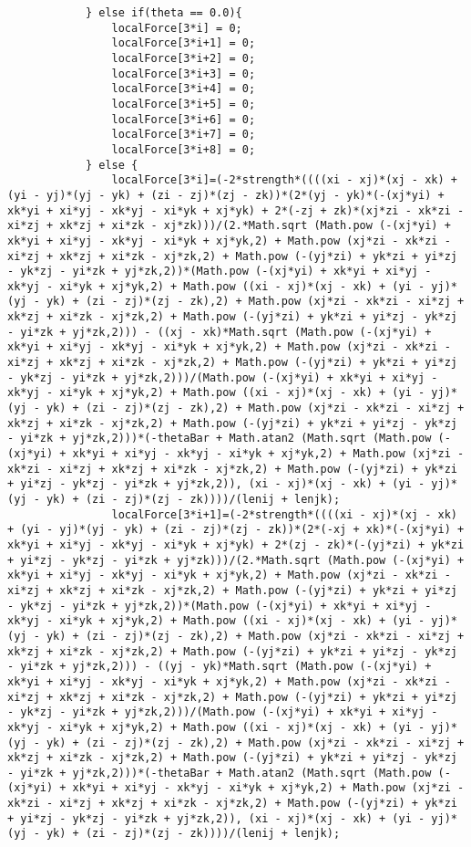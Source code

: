 \begin{lstlisting}
			} else if(theta == 0.0){
				localForce[3*i] = 0;
				localForce[3*i+1] = 0;
				localForce[3*i+2] = 0;
				localForce[3*i+3] = 0;
				localForce[3*i+4] = 0;
				localForce[3*i+5] = 0;
				localForce[3*i+6] = 0;
				localForce[3*i+7] = 0;
				localForce[3*i+8] = 0;
			} else {
				localForce[3*i]=(-2*strength*((((xi - xj)*(xj - xk) + (yi - yj)*(yj - yk) + (zi - zj)*(zj - zk))*(2*(yj - yk)*(-(xj*yi) + xk*yi + xi*yj - xk*yj - xi*yk + xj*yk) + 2*(-zj + zk)*(xj*zi - xk*zi - xi*zj + xk*zj + xi*zk - xj*zk)))/(2.*Math.sqrt (Math.pow (-(xj*yi) + xk*yi + xi*yj - xk*yj - xi*yk + xj*yk,2) + Math.pow (xj*zi - xk*zi - xi*zj + xk*zj + xi*zk - xj*zk,2) + Math.pow (-(yj*zi) + yk*zi + yi*zj - yk*zj - yi*zk + yj*zk,2))*(Math.pow (-(xj*yi) + xk*yi + xi*yj - xk*yj - xi*yk + xj*yk,2) + Math.pow ((xi - xj)*(xj - xk) + (yi - yj)*(yj - yk) + (zi - zj)*(zj - zk),2) + Math.pow (xj*zi - xk*zi - xi*zj + xk*zj + xi*zk - xj*zk,2) + Math.pow (-(yj*zi) + yk*zi + yi*zj - yk*zj - yi*zk + yj*zk,2))) - ((xj - xk)*Math.sqrt (Math.pow (-(xj*yi) + xk*yi + xi*yj - xk*yj - xi*yk + xj*yk,2) + Math.pow (xj*zi - xk*zi - xi*zj + xk*zj + xi*zk - xj*zk,2) + Math.pow (-(yj*zi) + yk*zi + yi*zj - yk*zj - yi*zk + yj*zk,2)))/(Math.pow (-(xj*yi) + xk*yi + xi*yj - xk*yj - xi*yk + xj*yk,2) + Math.pow ((xi - xj)*(xj - xk) + (yi - yj)*(yj - yk) + (zi - zj)*(zj - zk),2) + Math.pow (xj*zi - xk*zi - xi*zj + xk*zj + xi*zk - xj*zk,2) + Math.pow (-(yj*zi) + yk*zi + yi*zj - yk*zj - yi*zk + yj*zk,2)))*(-thetaBar + Math.atan2 (Math.sqrt (Math.pow (-(xj*yi) + xk*yi + xi*yj - xk*yj - xi*yk + xj*yk,2) + Math.pow (xj*zi - xk*zi - xi*zj + xk*zj + xi*zk - xj*zk,2) + Math.pow (-(yj*zi) + yk*zi + yi*zj - yk*zj - yi*zk + yj*zk,2)), (xi - xj)*(xj - xk) + (yi - yj)*(yj - yk) + (zi - zj)*(zj - zk))))/(lenij + lenjk);
				localForce[3*i+1]=(-2*strength*((((xi - xj)*(xj - xk) + (yi - yj)*(yj - yk) + (zi - zj)*(zj - zk))*(2*(-xj + xk)*(-(xj*yi) + xk*yi + xi*yj - xk*yj - xi*yk + xj*yk) + 2*(zj - zk)*(-(yj*zi) + yk*zi + yi*zj - yk*zj - yi*zk + yj*zk)))/(2.*Math.sqrt (Math.pow (-(xj*yi) + xk*yi + xi*yj - xk*yj - xi*yk + xj*yk,2) + Math.pow (xj*zi - xk*zi - xi*zj + xk*zj + xi*zk - xj*zk,2) + Math.pow (-(yj*zi) + yk*zi + yi*zj - yk*zj - yi*zk + yj*zk,2))*(Math.pow (-(xj*yi) + xk*yi + xi*yj - xk*yj - xi*yk + xj*yk,2) + Math.pow ((xi - xj)*(xj - xk) + (yi - yj)*(yj - yk) + (zi - zj)*(zj - zk),2) + Math.pow (xj*zi - xk*zi - xi*zj + xk*zj + xi*zk - xj*zk,2) + Math.pow (-(yj*zi) + yk*zi + yi*zj - yk*zj - yi*zk + yj*zk,2))) - ((yj - yk)*Math.sqrt (Math.pow (-(xj*yi) + xk*yi + xi*yj - xk*yj - xi*yk + xj*yk,2) + Math.pow (xj*zi - xk*zi - xi*zj + xk*zj + xi*zk - xj*zk,2) + Math.pow (-(yj*zi) + yk*zi + yi*zj - yk*zj - yi*zk + yj*zk,2)))/(Math.pow (-(xj*yi) + xk*yi + xi*yj - xk*yj - xi*yk + xj*yk,2) + Math.pow ((xi - xj)*(xj - xk) + (yi - yj)*(yj - yk) + (zi - zj)*(zj - zk),2) + Math.pow (xj*zi - xk*zi - xi*zj + xk*zj + xi*zk - xj*zk,2) + Math.pow (-(yj*zi) + yk*zi + yi*zj - yk*zj - yi*zk + yj*zk,2)))*(-thetaBar + Math.atan2 (Math.sqrt (Math.pow (-(xj*yi) + xk*yi + xi*yj - xk*yj - xi*yk + xj*yk,2) + Math.pow (xj*zi - xk*zi - xi*zj + xk*zj + xi*zk - xj*zk,2) + Math.pow (-(yj*zi) + yk*zi + yi*zj - yk*zj - yi*zk + yj*zk,2)), (xi - xj)*(xj - xk) + (yi - yj)*(yj - yk) + (zi - zj)*(zj - zk))))/(lenij + lenjk);

\end{lstlisting}
